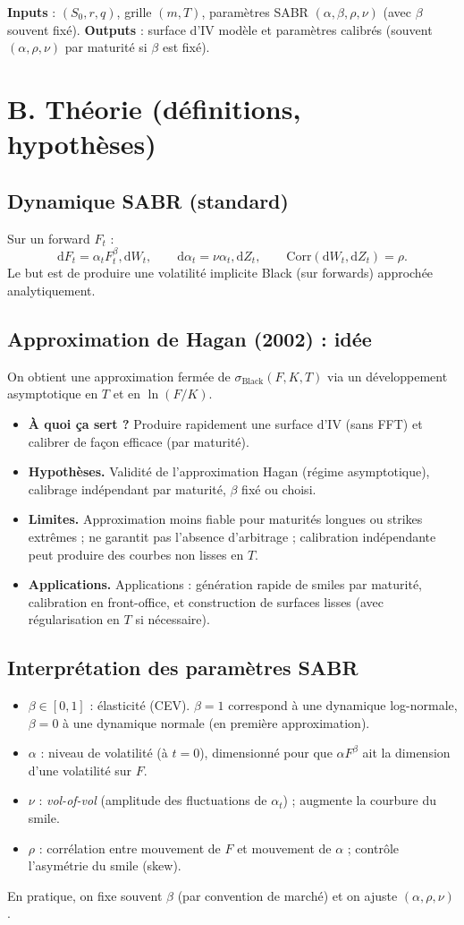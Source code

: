 \documentclass[11pt,a4paper]{report}
\theoremstyle{definition}
\theoremstyle{plain}
\theoremstyle{remark}
\newcommand{\dd}{\mathrm{d}}
\newcommand{\Corr}{\mathrm{Corr}}
\newcommand{\1}{\mathbf{1}}
\newcommand{\qa}[4]{
\begin{itemize}[leftmargin=*]
\item \textbf{À quoi ça sert ?} #1
\item \textbf{Hypothèses.} #2
\item \textbf{Limites.} #3
\item \textbf{Applications.} #4
\end{itemize}
}
\begin{document}
\textbf{Inputs} : $(S_0,r,q)$, grille $(m,T)$, paramètres SABR $(\alpha,\beta,\rho,\nu)$ (avec $\beta$ souvent fixé).
\textbf{Outputs} : surface d'IV modèle et paramètres calibrés (souvent $(\alpha,\rho,\nu)$ par maturité si $\beta$ est fixé).

\section{B. Théorie (définitions, hypothèses)}
\subsection*{Dynamique SABR (standard)}
Sur un forward $F_t$ :
\[
\dd F_t = \alpha_t F_t^\beta,\dd W_t,\qquad
\dd \alpha_t = \nu \alpha_t,\dd Z_t,\qquad
\Corr(\dd W_t,\dd Z_t)=\rho.
\]
Le but est de produire une volatilité implicite Black (sur forwards) approchée analytiquement.

\subsection*{Approximation de Hagan (2002) : idée}
On obtient une approximation fermée de $\sigma_{\text{Black}}(F,K,T)$ via un développement asymptotique en $T$ et en $\ln(F/K)$.

\qa
{Produire rapidement une surface d'IV (sans FFT) et calibrer de façon efficace (par maturité).}
{Validité de l'approximation Hagan (régime asymptotique), calibrage indépendant par maturité, $\beta$ fixé ou choisi.}
{Approximation moins fiable pour maturités longues ou strikes extrêmes ; ne garantit pas l'absence d'arbitrage ; calibration indépendante peut produire des courbes non lisses en $T$.}
{Applications : génération rapide de smiles par maturité, calibration en front-office, et construction de surfaces lisses (avec régularisation en $T$ si nécessaire).}

\subsection*{Interprétation des paramètres SABR}
\begin{itemize}[leftmargin=*]
\item $\beta\in[0,1]$ : élasticité (CEV). $\beta=1$ correspond à une dynamique log-normale, $\beta=0$ à une dynamique normale (en première approximation).
\item $\alpha$ : niveau de volatilité (à $t=0$), dimensionné pour que $\alpha F^\beta$ ait la dimension d'une volatilité sur $F$.
\item $\nu$ : \emph{vol-of-vol} (amplitude des fluctuations de $\alpha_t$) ; augmente la courbure du smile.
\item $\rho$ : corrélation entre mouvement de $F$ et mouvement de $\alpha$ ; contrôle l'asymétrie du smile (skew).
\end{itemize}
En pratique, on fixe souvent $\beta$ (par convention de marché) et on ajuste $(\alpha,\rho,\nu)$.
\end{document}
